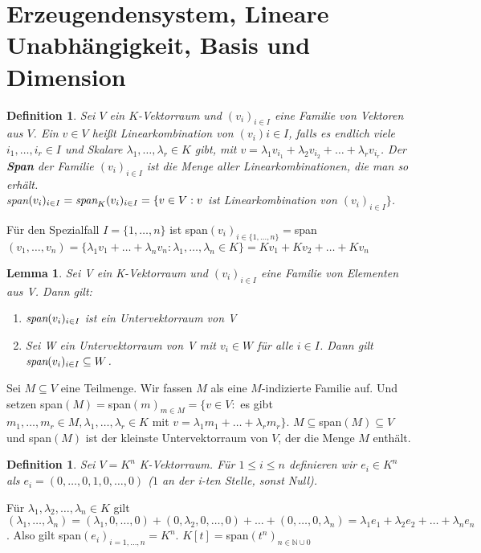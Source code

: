 \documentclass[12pt,a4paper]{article}
\theoremstyle{plain}
\newtheorem{Lemma}[Theorem]{Lemma}
\newtheorem{Definition}[Theorem]{Definition}
\newcommand{\herv}[1]{{\emph{\textbf{#1}}}}
\newcommand{\N}{\mathbb{N}}
\numberwithin{equation}{section}
\begin{document}
\section{Erzeugendensystem, Lineare Unabhängigkeit, Basis und Dimension}
\begin{Definition}
Sei $V$ ein $K$-Vektorraum und $(v_i)_{i\in I}$ eine Familie von Vektoren aus $V$. Ein $v\in V$ heißt Linearkombination von $(v_i){i\in I}$, falls es endlich viele $i_1,\ldots,i_r\in I$ und Skalare $\lambda_1,\ldots,\lambda_r\in K$ gibt, mit $v=\lambda_1 v_{i_1}+\lambda_2 v_{i_2}+\ldots+\lambda_r v_{i_r}$. Der \herv{Span} der Familie $(v_i)_{i\in I}$ ist die Menge aller Linearkombinationen, die man so erhält.\\
\emph{span}$(v_i)_{i\in I} = \emph{span}_K(v_i)_{i\in I}= \{v\in V: v$ ist Linearkombination von $(v_i)_{i\in I} \}$. 
\end{Definition}
Für den Spezialfall $I=\{1,\ldots,n\}$ ist span$(v_i)_{i\in \{1,\ldots,n\}}=$span$(v_1,\ldots,v_n)=\{\lambda_1 v_1 + \ldots + \lambda_n v_n : \lambda_1,\ldots,\lambda_n\in K\}=Kv_1+Kv_2+\ldots+Kv_n$
\begin{Lemma}
Sei V ein K-Vektorraum und $(v_i)_{i\in I}$ eine Familie von Elementen aus V. Dann gilt:
\begin{enumerate}
\renewcommand{\labelenumi}{\emph{\alph{enumi})}}
\item $\emph{span}(v_i)_{i\in I}$ ist ein Untervektorraum von V
\item Sei W ein Untervektorraum von V mit $v_i\in W$ für alle $i\in I$. Dann gilt $\emph{span}(v_i)_{i\in I}\subseteq W$.
\end{enumerate}
\end{Lemma}
Sei $M\subseteq V$ eine Teilmenge. Wir fassen $M$ als eine $M$-indizierte Familie auf. Und setzen span$(M)=$span$(m)_{m\in M}=\{v\in V:$ es gibt $m_1,\ldots,m_r\in M, \lambda_1,\ldots,\lambda_r\in K$ mit $v=\lambda_1m_1+\ldots+\lambda_rm_r\}$. $M\subseteq$span$(M)\subseteq V$ und span$(M)$ ist der kleinste Untervektorraum von $V$, der die Menge $M$ enthält.
\begin{Definition}
Sei $V=K^n$ K-Vektorraum. Für $1\leq i\leq n$ definieren wir $e_i\in K^n$ als $e_i=(0,\ldots,0,1,0,\ldots,0)$ ($1$ an der i-ten Stelle, sonst Null).
\end{Definition}
Für $\lambda_1,\lambda_2,\ldots,\lambda_n\in K$ gilt $(\lambda_1,\ldots,\lambda_n)=(\lambda_1,0,\ldots,0)+(0,\lambda_2,0,\ldots,0)+\ldots+(0,\ldots,0,\lambda_n)=\lambda_1e_1+\lambda_2e_2+\ldots+\lambda_ne_n$. Also gilt span$(e_i)_{i=1,\ldots,n}=K^n$. $K[t]=$span$(t^n)_{n\in\N\cup 0}$ \\
\end{document}
